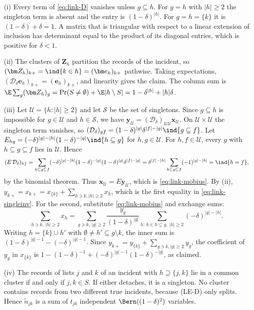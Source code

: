 (i) Every term of \eqref{eq:link-D} vanishes unless $g\subseteq h$. For $g=h$ with $|h|\ge2$ the singleton term is absent and the entry is $(1-\delta)^{|h|}$. For $g=h=\{k\}$ it is $(1-\delta)+\delta=1$. A matrix that is triangular with respect to a linear extension of inclusion has determinant equal to the product of its diagonal entries, which is positive for $\delta<1$.

(ii) The clusters of $\bm Z_h$ partition the records of the incident, so $(\bm Z_h)_{k+}=\ind{k\in h}=(\bm e_h)_{k+}$ pathwise. Taking expectations, $(\mathcal D_\delta\bm e_h)_{k+}=(\bm e_h)_{k+}$, and linearity gives the claim. The column sum is $\E\sum_g(\bm Z_h)_g=\Pr(S\ne\emptyset)+\E|h\setminus S|=1-\delta^{|h|}+|h|\delta$.

(iii) Let $\mathcal U=\{h:|h|\ge2\}$ and let $\mathcal S$ be the set of singletons. Since $g\subseteq h$ is impossible for $g\in\mathcal U$ and $h\in\mathcal S$, we have $\bm y_{\mathcal U}=(\mathcal D_\delta)_{\mathcal U\mathcal U}\bm x_{\mathcal U}$. On $\mathcal U\times\mathcal U$ the singleton term vanishes, so $(\mathcal D_\delta)_{gf}=(1-\delta)^{|g|}\delta^{|f|-|g|}\ind{g\subseteq f}$. Let $E_{hg}=(-\delta)^{|g|-|h|}(1-\delta)^{-|g|}\ind{h\subseteq g}$ for $h,g\in\mathcal U$. For $h,f\in\mathcal U$, every $g$ with $h\subseteq g\subseteq f$ lies in $\mathcal U$. Hence
\[
  (E\,\mathcal D_\delta)_{hf}=\sum_{h\subseteq g\subseteq f}(-\delta)^{|g|-|h|}(1-\delta)^{-|g|}(1-\delta)^{|g|}\delta^{|f|-|g|}
  =\delta^{|f|-|h|}\sum_{h\subseteq g\subseteq f}(-1)^{|g|-|h|}=\ind{h=f},
\]
by the binomial theorem. Thus $\bm x_{\mathcal U}=E\bm y_{\mathcal U}$, which is \eqref{eq:link-mobius}. By (ii), $y_{k+}=x_{k+}=x_{\{k\}}+\sum_{h\ni k,|h|\ge2}x_h$, which is the first equality in \eqref{eq:link-singleinv}. For the second, substitute \eqref{eq:link-mobius} and exchange sums:
\[
  \sum_{h\ni k,\,|h|\ge2}x_h=\sum_{g\ni k,\,|g|\ge2}\frac{y_g}{(1-\delta)^{|g|}}\sum_{h:\,k\in h\subseteq g,\ |h|\ge2}(-\delta)^{|g|-|h|} .
\]
Writing $h=\{k\}\cup h'$ with $\emptyset\ne h'\subseteq g\setminus k$, the inner sum is $(1-\delta)^{|g|-1}-(-\delta)^{|g|-1}$. Since $y_{k+}=y_{\{k\}}+\sum_{g\ni k,|g|\ge2}y_g$, the coefficient of $y_g$ in $x_{\{k\}}$ is $1-(1-\delta)^{-1}+(-\delta)^{|g|-1}(1-\delta)^{-|g|}$, as claimed.

(iv) The records of lists $j$ and $k$ of an incident with $h\supseteq\{j,k\}$ lie in a common cluster if and only if $j,k\in S$. If either detaches, it is a singleton. No cluster contains records from two different true incidents, because (LE-D) only splits. Hence $\tilde n_{jk}$ is a sum of $t_{jk}$ independent $\Bern((1-\delta)^2)$ variables.

